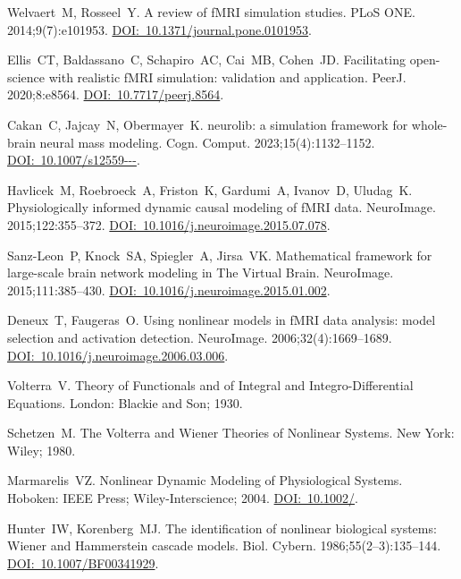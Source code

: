 \documentclass[11pt,twoside,a4paper]{article}
\begin{document}
{\begin{ltrtq}
	{Welvaert~M, Rosseel~Y.} A review of fMRI simulation studies. {PLoS ONE}. 2014;9(7):e101953. \href{https://doi.org/10.1371/journal.pone.0101953}{DOI:~10.1371/\allowbreak journal.pone.0101953}.

	{Ellis~CT, Baldassano~C, Schapiro~AC, Cai~MB, Cohen~JD.} Facilitating open-science with realistic fMRI simulation: validation and application. {PeerJ}. 2020;8:e8564. \href{https://doi.org/10.7717/peerj.8564}{DOI:~10.7717/\allowbreak peerj.8564}.

	{Cakan~C, Jajcay~N, Obermayer~K.} neurolib: a simulation framework for whole-brain neural mass modeling. {Cogn. Comput}. 2023;15(4):1132--1152. \href{https://doi.org/10.1007/s12559-021-09931-9}{DOI:~10.1007/\allowbreak s12559---}.

	{Havlicek~M, Roebroeck~A, Friston~K, Gardumi~A, Ivanov~D, Uludag~K.} Physiologically informed dynamic causal modeling of fMRI data. {NeuroImage}. 2015;122:355--372. \href{https://doi.org/10.1016/j.neuroimage.2015.07.078}{DOI:~10.1016/\allowbreak j.neuroimage.2015.07.078}.

	{Sanz-Leon~P, Knock~SA, Spiegler~A, Jirsa~VK.} Mathematical framework for large-scale brain network modeling in The Virtual Brain. {NeuroImage}. 2015;111:385--430. \href{https://doi.org/10.1016/j.neuroimage.2015.01.002}{DOI:~10.1016/\allowbreak j.neuroimage.2015.01.002}.

	{Deneux~T, Faugeras~O.} Using nonlinear models in fMRI data analysis: model selection and activation detection. {NeuroImage}. 2006;32(4):1669--1689. \href{https://doi.org/10.1016/j.neuroimage.2006.03.006}{DOI:~10.1016/\allowbreak j.neuroimage.2006.03.006}.

	{Volterra~V.} Theory of Functionals and of Integral and Integro-Differential Equations. London: Blackie and Son; 1930.

	{Schetzen~M.} The Volterra and Wiener Theories of Nonlinear Systems. New York: Wiley; 1980.

	{Marmarelis~VZ.} Nonlinear Dynamic Modeling of Physiological Systems. Hoboken: IEEE Press; Wiley-Interscience; 2004. \href{https://doi.org/10.1002/9780471679370}{DOI:~10.1002/}.

	{Hunter~IW, Korenberg~MJ.} The identification of nonlinear biological systems: Wiener and Hammerstein cascade models. {Biol. Cybern}. 1986;55(2--3):135--144. \href{https://doi.org/10.1007/BF00341929}{DOI:~10.1007/\allowbreak BF00341929}.


\end{ltrtq}}
\end{document}
